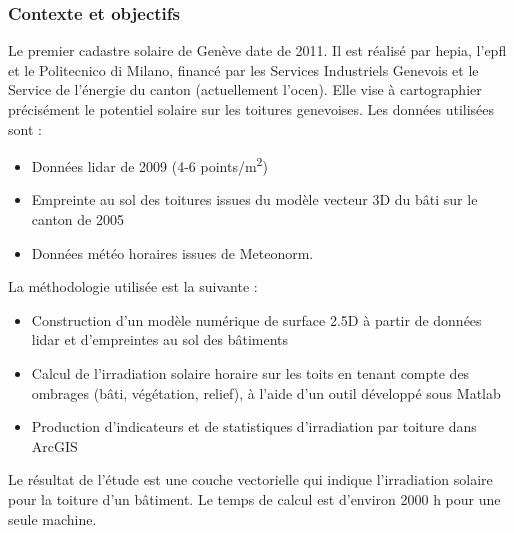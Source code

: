 \subsubsection{Contexte et objectifs}
\par{Le premier cadastre solaire de Genève \cite{desthieux_etude_2011} date de 2011. Il est réalisé par \acrshort{hepia}, l'\acrshort{epfl} et le Politecnico di Milano, financé par les Services Industriels Genevois et le Service de l'énergie du canton (actuellement l'\acrshort{ocen}). Elle vise à cartographier précisément le potentiel solaire sur les toitures genevoises. Les données utilisées sont :}

\begin{itemize}
    \item Données \gls{lidar} de 2009 (4-6 \si{\unit{points/m^2}}) \cite{sitg_nuages_2009}
    \item Empreinte au sol des toitures issues du modèle vecteur 3D du bâti sur le canton de 2005
    \item Données météo horaires issues de Meteonorm.
\end{itemize}

La méthodologie utilisée est la suivante :

\begin{itemize}
    \item Construction d'un modèle numérique de surface 2.5D à partir de données \gls{lidar} et d'empreintes au sol des bâtiments
    \item Calcul de l'irradiation solaire horaire sur les toits en tenant compte des ombrages (bâti, végétation, relief), à l'aide d'un outil développé sous Matlab
    \item Production d'indicateurs et de statistiques d'irradiation par toiture dans ArcGIS
\end{itemize}

\par{Le résultat de l'étude est une couche vectorielle qui indique l'irradiation solaire pour la toiture d'un bâtiment. Le temps de calcul est d'environ 2000 h pour une seule machine.}

